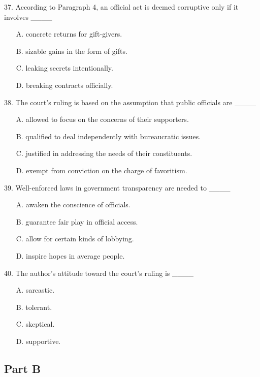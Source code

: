 \documentclass[UTF8,11pt]{ctexart}
\begin{document}
37. According to Paragraph 4, an official act is deemed corruptive only if it involves \_\_\_\_


\begin{itemize}[leftmargin=2em,itemsep=.2em,topsep=.4em]\item[A.] concrete returns for gift-givers.
\item[B.] sizable gains in the form of gifts.
\item[C.] leaking secrets intentionally.
\item[D.] breaking contracts officially.
\end{itemize}

38. The court’s ruling is based on the assumption that public officials are \_\_\_\_


\begin{itemize}[leftmargin=2em,itemsep=.2em,topsep=.4em]\item[A.] allowed to focus on the concerns of their supporters.
\item[B.] qualified to deal independently with bureaucratic issues.
\item[C.] justified in addressing the needs of their constituents.
\item[D.] exempt from conviction on the charge of favoritism.
\end{itemize}

39. Well-enforced laws in government transparency are needed to \_\_\_\_


\begin{itemize}[leftmargin=2em,itemsep=.2em,topsep=.4em]\item[A.] awaken the conscience of officials.
\item[B.] guarantee fair play in official access.
\item[C.] allow for certain kinds of lobbying.
\item[D.] inspire hopes in average people.
\end{itemize}

40. The author’s attitude toward the court’s ruling is \_\_\_\_


\begin{itemize}[leftmargin=2em,itemsep=.2em,topsep=.4em]\item[A.] sarcastic.
\item[B.] tolerant.
\item[C.] skeptical.
\item[D.] supportive.
\end{itemize}

\subsection*{\textbf{Part B}}
\end{document}
